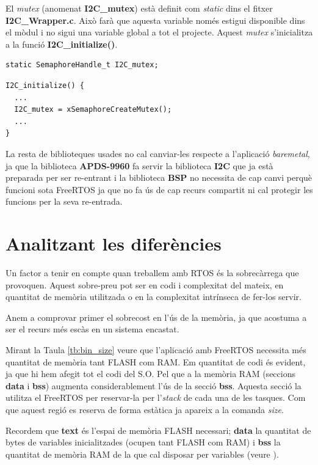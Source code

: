 El {\em mutex} (anomenat {\bf I2C\_mutex}) està definit com {\em static} dins el fitxer {\bf I2C\_Wrapper.c}. Això farà que aquesta variable només estigui disponible dins el mòdul i no sigui una variable global a tot el projecte. Aquest {\em mutex} s'inicialitza a la funció {\bf I2C\_initialize()}.

\begin{lstlisting}[style=customc,label=I2CMutex]
static SemaphoreHandle_t I2C_mutex;
\end{lstlisting}



\begin{lstlisting}[style=customc,label=CreateI2CMutex]
I2C_initialize() {
  ...
  I2C_mutex = xSemaphoreCreateMutex();
  ...
}
\end{lstlisting}

La resta de biblioteques usades no cal canviar-les respecte a l'aplicació {\em baremetal}, ja que la biblioteca {\bf APDS-9960} fa servir la biblioteca {\bf I2C} que ja està preparada per ser re-entrant i la biblioteca {\bf BSP} no necessita de cap canvi perquè funcioni sota FreeRTOS ja que no fa ús de cap recurs compartit ni cal protegir les funcions per la seva re-entrada.

\section{Analitzant les diferències}
Un factor a tenir en compte quan treballem amb \gls{RTOS} és la sobrecàrrega que provoquen. Aquest sobre-preu pot ser en codi i complexitat del mateix, en quantitat de memòria utilitzada o en la complexitat intrínseca de fer-los servir.

Anem a comprovar primer el sobrecost en l'ús de la memòria, ja que acostuma a ser el recurs més escàs en un sistema encastat.

Mirant la Taula \ref{tb:bin_size} veure que l'aplicació amb FreeRTOS necessita més quantitat de memòria tant FLASH com RAM. Em quantitat de codi és evident, ja que hi hem afegit tot el codi del S.O. Pel que a la memòria RAM (seccions {\bf data} i {\bf bss}) augmenta considerablement l'ús de la secció {\bf bss}. Aquesta secció la utilitza el FreeRTOS per reservar-la per l'{\em stack} de cada una de les tasques. Com que aquest regió es reserva de forma estàtica ja apareix a la comanda {\em size}.

\begin{remark}
 Recordem que {\bf text} és l'espai de memòria FLASH necessari; {\bf data} la quantitat de bytes de variables inicialitzades (ocupen tant FLASH com RAM) i {\bf bss} la quantitat de memòria RAM de la que cal disposar per variables (veure ).
\end{remark}


